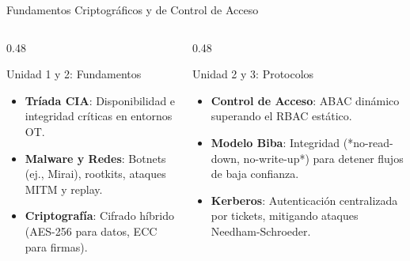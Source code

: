 \documentclass[10pt]{beamer}
\begin{document}
\begin{frame}{Fundamentos Criptográficos y de Control de Acceso}
  \begin{columns}[t, onlytextwidth]
    \begin{column}{0.48\textwidth}
      \begin{block}{Unidad 1 y 2: Fundamentos}
        \begin{itemize}
          \item \textbf{Tríada CIA}: Disponibilidad e integridad críticas en entornos OT.
          \item \textbf{Malware y Redes}: Botnets (ej., Mirai), rootkits, ataques MITM y replay.
          \item \textbf{Criptografía}: Cifrado híbrido (AES-256 para datos, ECC para firmas).
        \end{itemize}
      \end{block}
    \end{column}
    \hfill
    \begin{column}{0.48\textwidth}
      \begin{block}{Unidad 2 y 3: Protocolos}
        \begin{itemize}
          \item \textbf{Control de Acceso}: ABAC dinámico superando el RBAC estático.
          \item \textbf{Modelo Biba}: Integridad (*no-read-down, no-write-up*) para detener flujos de baja confianza.
          \item \textbf{Kerberos}: Autenticación centralizada por tickets, mitigando ataques Needham-Schroeder.
        \end{itemize}
      \end{block}
    \end{column}
  \end{columns}
\end{frame}
\end{document}

